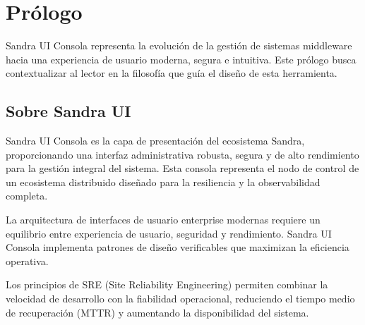 
\chapter*{Prólogo}

Sandra UI Consola representa la evolución de la gestión de sistemas middleware hacia una experiencia de usuario moderna, segura e intuitiva. Este prólogo busca contextualizar al lector en la filosofía que guía el diseño de esta herramienta.

\section*{Sobre Sandra UI}

Sandra UI Consola es la capa de presentación del ecosistema Sandra, proporcionando una interfaz administrativa robusta, segura y de alto rendimiento para la gestión integral del sistema. Esta consola representa el nodo de control de un ecosistema distribuido diseñado para la resiliencia y la observabilidad completa.

La arquitectura de interfaces de usuario enterprise modernas requiere un equilibrio entre experiencia de usuario, seguridad y rendimiento. Sandra UI Consola implementa patrones de diseño verificables que maximizan la eficiencia operativa.

Los principios de SRE (Site Reliability Engineering) permiten combinar la velocidad de desarrollo con la fiabilidad operacional, reduciendo el tiempo medio de recuperación (MTTR) y aumentando la disponibilidad del sistema.

\clearpage

